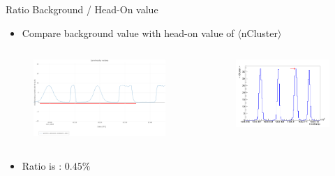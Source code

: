 \documentclass{beamer}
\begin{document}
	\begin{frame}
		\begin{block}{Ratio Background / Head-On value}
			\begin{itemize}[label=$\triangleright$]
				\item Compare background value with head-on value of $\langle$nCluster$\rangle$
			\end{itemize}
			\begin{columns}
				\begin{column}{4.2cm}
					\begin{figure}[H!]
						\begin{center}
							\includegraphics[scale=0.5]{longsepscan_3.png}
						\end{center}
					\end{figure}	
				\end{column}
				\begin{column}{5.5cm}
					\begin{figure}[H!]
						\begin{center}
							\includegraphics[scale=0.83]{Signal.png}
						\end{center}
					\end{figure}	
				\end{column}
			\end{columns}
			\begin{itemize}[label=$\triangleright$]
				\item Ratio is : $0.45 \%$
			\end{itemize}
		\end{block}
	\end{frame}
\end{document}
